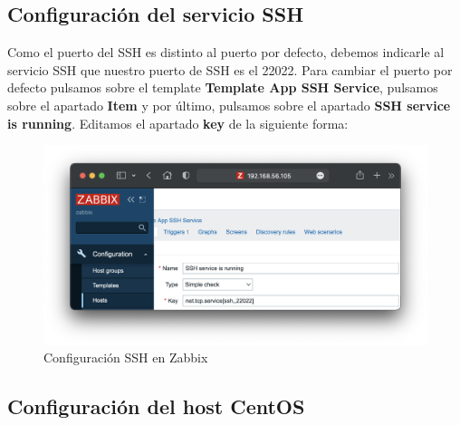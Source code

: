 \subsection{Configuración del servicio SSH}
Como el puerto del SSH es distinto al puerto por defecto, debemos indicarle al servicio SSH que nuestro puerto de SSH es el 22022. Para cambiar el puerto por defecto pulsamos
sobre el template \textbf{Template App SSH Service}, pulsamos sobre el apartado \textbf{Item} y por último, pulsamos sobre el apartado \textbf{SSH service is running}. Editamos
el apartado \textbf{key} de la siguiente forma:
    \begin{figure}[H]
        \centering
        \includegraphics[scale=0.5]{images/ip_items.png}
        \caption{Configuración SSH en Zabbix}
        \label{fig:ip_items}
    \end{figure}
\subsection{Configuración del host CentOS}
